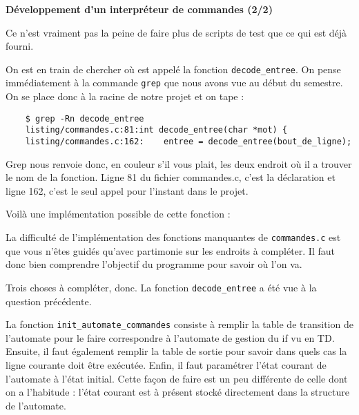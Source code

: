 \documentclass[10pt]{article}
\begin{document}
\vspace*{0.5cm}

\begin{center}
  {\large {\bf Développement d'un interpréteur de commandes (2/2)}}
\end{center}

\vspace*{0.5cm}

\begin{enumerate}[label=\textbf{[\alph*]}]
  \setlength\itemsep{1em}

\item Ce n'est vraiment pas la peine de faire plus de scripts de test
  que ce qui est déjà fourni.

\item On est en train de chercher où est appelé la fonction
  \texttt{decode\_entree}. On pense immédiatement à la commande
  \texttt{grep} que nous avons vue au début du semestre. On se place
  donc à la racine de notre projet et on tape :

\begin{verbatim}
    $ grep -Rn decode_entree
    listing/commandes.c:81:int decode_entree(char *mot) {
    listing/commandes.c:162:    entree = decode_entree(bout_de_ligne);
\end{verbatim}

  Grep nous renvoie donc, en couleur s'il vous plait, les deux endroit
  où il a trouver le nom de la fonction. Ligne 81 du fichier
  commandes.c, c'est la déclaration et ligne 162, c'est le seul appel
  pour l'instant dans le projet.

  \vspace{0.2cm}
  Voilà une implémentation possible de cette fonction :

  

\item La difficulté de l'implémentation des fonctions manquantes de
  \texttt{commandes.c} est que vous n'êtes guidés qu'avec partimonie
  sur les endroits à compléter. Il faut donc bien comprendre
  l'objectif du programme pour savoir où l'on va.

  \vspace{0.2cm}
  Trois choses à compléter, donc. La fonction \texttt{decode\_entree}
  a été vue à la question précédente.

  \vspace{0.2cm}
  La fonction
  \texttt{init\_automate\_commandes} consiste à remplir la table de
  transition de l'automate pour le faire correspondre à l'automate de
  gestion du if vu en TD. Ensuite, il faut également remplir la table
  de sortie pour savoir dans quels cas la ligne courante doit être
  exécutée. Enfin, il faut paramétrer l'état courant de l'automate à
  l'état initial. Cette façon de faire est un peu différente de celle
  dont on a l'habitude : l'état courant est à présent stocké
  directement dans la structure de l'automate.



\end{enumerate}
\end{document}
